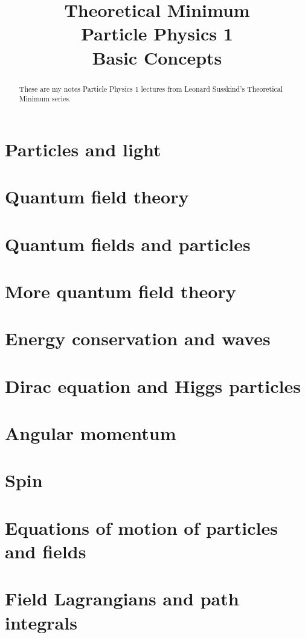 \documentclass[]{article}
\title{Theoretical Minimum\\Particle Physics 1\\Basic Concepts}
\author{}
\begin{document}
\maketitle

\begin{abstract}
These are my notes Particle Physics 1 lectures from Leonard Susskind's Theoretical Minimum series.
\end{abstract}

\tableofcontents

\section{Particles and light}
\section{Quantum field theory}
\section{Quantum fields and particles}
\section{More quantum field theory}
\section{Energy conservation and waves}
\section{Dirac equation and Higgs particles}
\section{Angular momentum}
\section{Spin}
\section{Equations of motion of particles and fields}
\section{Field Lagrangians and path integrals}
\end{document}

